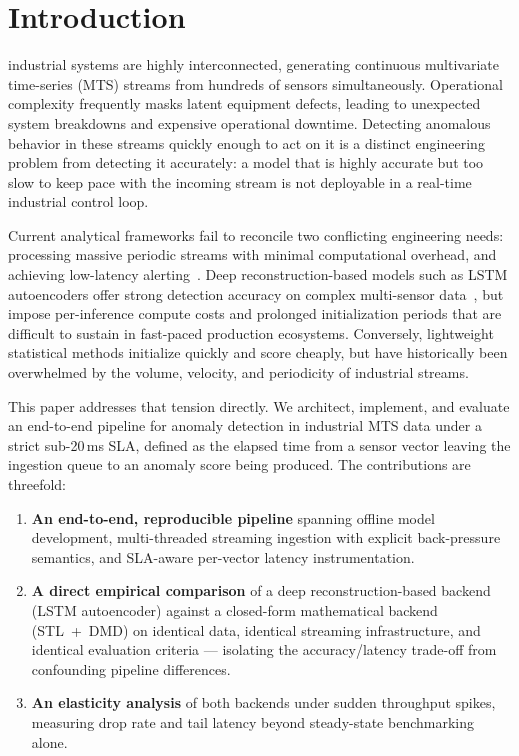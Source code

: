\section{Introduction}
 industrial systems are highly interconnected,
generating continuous multivariate time-series (MTS) streams from hundreds of
sensors simultaneously. Operational complexity frequently masks latent
equipment defects, leading to unexpected system breakdowns and expensive
operational downtime. Detecting anomalous behavior in these streams quickly
enough to act on it is a distinct engineering problem from detecting it
accurately: a model that is highly accurate but too slow to keep pace with
the incoming stream is not deployable in a real-time industrial control loop.

Current analytical frameworks fail to reconcile two conflicting engineering
needs: processing massive periodic streams with minimal computational
overhead, and achieving low-latency alerting~\cite{tao2025realtime,
exarchos2021anomaly}. Deep reconstruction-based models such as LSTM
autoencoders offer strong detection accuracy on complex multi-sensor
data~\cite{malhotra2015lstm}, but impose per-inference compute costs and
prolonged initialization periods that are difficult to sustain in
fast-paced production ecosystems. Conversely, lightweight statistical
methods initialize quickly and score cheaply, but have historically been
overwhelmed by the volume, velocity, and periodicity of industrial streams.

This paper addresses that tension directly. We architect, implement, and
evaluate an end-to-end pipeline for anomaly detection in industrial MTS
data under a strict sub-20\,ms SLA, defined as the elapsed time from a
sensor vector leaving the ingestion queue to an anomaly score being
produced. The contributions are threefold:

\begin{enumerate}
  \item \textbf{An end-to-end, reproducible pipeline} spanning offline model
        development, multi-threaded streaming ingestion with explicit
        back-pressure semantics, and SLA-aware per-vector latency
        instrumentation.
  \item \textbf{A direct empirical comparison} of a deep reconstruction-based
        backend (LSTM autoencoder) against a closed-form mathematical
        backend (STL~+~DMD) on identical data, identical streaming
        infrastructure, and identical evaluation criteria --- isolating the
        accuracy/latency trade-off from confounding pipeline differences.
  \item \textbf{An elasticity analysis} of both backends under sudden
        throughput spikes, measuring drop rate and tail latency beyond
        steady-state benchmarking alone.
\end{enumerate}

